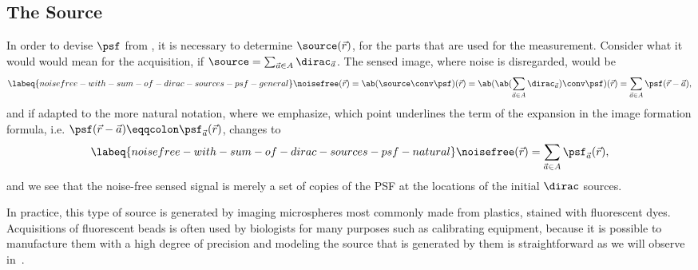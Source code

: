\subsection{The Source}
In order to devise \(\psf\) from , it is necessary to determine \(\source(\vec{r})\), for the
    parts that are used for the measurement.
Consider what it would would mean for the acquisition, if \(\source= \sum_{\vec{a} \in A} \dirac_{\vec{a}}\).
The sensed image, where noise is disregarded, would be
    \begin{equation}
        \labeq{noisefree-with-sum-of-dirac-sources-psf-general}
        \noisefree(\vec{r}) = \ab(\source \conv \psf)(\vec{r}) = \ab(\ab(\sum_{\vec{a} \in A} \dirac_{\vec{a}}) \conv
            \psf)(\vec{r}) = \sum_{\vec{a} \in A} \psf(\vec{r} - \vec{a}),
    \end{equation}
    and if adapted to the more natural notation, where we emphasize, which point underlines the term of the expansion in
    the image formation formula, i.e. \(\psf(\vec{r} - \vec{a}) \eqqcolon \psf_{\vec{a}}
    (\vec{r})\),  changes to
    \begin{equation}
        \labeq{noisefree-with-sum-of-dirac-sources-psf-natural}
        \noisefree(\vec{r}) = \sum_{\vec{a} \in A} \psf_{\vec{a}}(\vec{r}),
    \end{equation}
    and we see that the noise-free sensed signal is merely a set of copies of the \ac{PSF} at the locations of the
    initial \(\dirac\) sources.

In practice, this type of source is generated by imaging microspheres most commonly made from plastics, stained with 
    fluorescent dyes.
Acquisitions of fluorescent beads is often used by biologists for many purposes such as calibrating equipment, because 
    it is possible to manufacture them with a high degree of precision and modeling the source that is generated by them
    is straightforward as we will observe in~.


